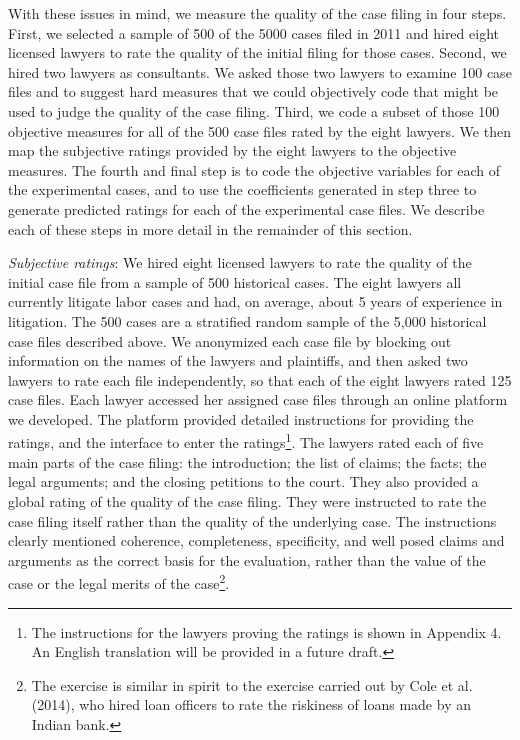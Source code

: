 \documentclass[12 pt]{article}
\begin{document}
With these issues in mind, we measure the quality of the case filing in four steps. First, we selected a sample of 500 of the 5000 cases filed in 2011 and hired eight licensed lawyers to rate the quality of the initial filing for those cases. Second, we hired two lawyers as consultants. We asked those two lawyers to examine 100 case files and to suggest hard measures that we could objectively code that might be used to judge the quality of the case filing. Third, we code a subset of those 100 objective measures for all of the 500 case files rated by the eight lawyers. We then map the subjective ratings provided by the eight lawyers to the objective measures. The fourth and final step is to code the objective variables for each of the experimental cases, and to use the coefficients generated in step three to generate predicted ratings for each of the experimental case files. We describe each of these steps in more detail in the remainder of this section. 

\emph{Subjective ratings}: We hired eight licensed lawyers to rate the quality of the initial case file from a sample of 500 historical cases. The eight lawyers all currently litigate labor cases and had, on average, about 5 years of experience in litigation. The 500 cases are a stratified random sample of the 5,000 historical case files described above. We anonymized each case file by blocking out information on the names of the lawyers and plaintiffs, and then asked two lawyers to rate each file independently, so that each of the eight lawyers rated 125 case files. Each lawyer accessed her assigned case files through an online platform we developed. The platform provided detailed instructions for providing the ratings, and the interface to enter the ratings\footnote{The instructions for the lawyers proving the ratings is shown in Appendix 4. An English translation will be provided in a future draft.}.  The lawyers rated each of five main parts of the case filing: the introduction; the list of claims; the facts; the legal arguments; and the closing petitions to the court. They also provided a global rating of the quality of the case filing. They were instructed to rate the case filing itself rather than the quality of the underlying case. The instructions clearly mentioned coherence, completeness, specificity, and well posed claims and arguments as the correct basis for the evaluation, rather than the value of the case or the legal merits of the case\footnote{The exercise is similar in spirit to the exercise carried out by Cole et al. (2014), who hired loan officers to rate the riskiness of loans made by an Indian bank.}. 
\end{document}
